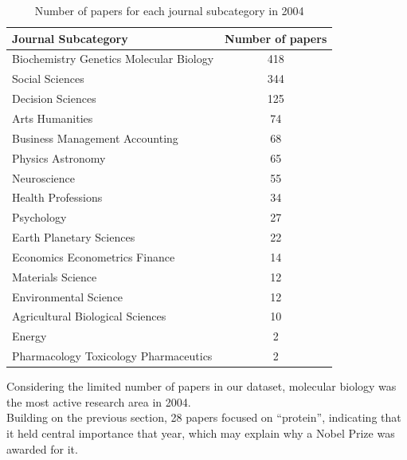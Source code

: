 \documentclass{article}
\begin{document}
\begin{table}[H]
	\centering
	\begin{tabular}{|l|c|}
		\hline
		\textbf{Journal Subcategory}            & \textbf{Number of papers} \\ \hline
		Biochemistry Genetics Molecular Biology & 418                       \\ \hline
		Social Sciences                         & 344                       \\ \hline
		Decision Sciences                       & 125                       \\ \hline
		Arts Humanities                         & 74                        \\ \hline
		Business Management Accounting          & 68                        \\ \hline
		Physics Astronomy                       & 65                        \\ \hline
		Neuroscience                            & 55                        \\ \hline
		Health Professions                      & 34                        \\ \hline
		Psychology                              & 27                        \\ \hline
		Earth Planetary Sciences                & 22                        \\ \hline
		Economics Econometrics Finance          & 14                        \\ \hline
		Materials Science                       & 12                        \\ \hline
		Environmental Science                   & 12                        \\ \hline
		Agricultural Biological Sciences        & 10                        \\ \hline
		Energy                                  & 2                         \\ \hline
		Pharmacology Toxicology Pharmaceutics   & 2                         \\ \hline
	\end{tabular}
	\caption{Number of papers for each journal subcategory in 2004}
	\label{tab:papersPerSubcategoryPerYear}
\end{table}
Considering the limited number of papers in our dataset, molecular biology
was the most active research area in 2004.\\
Building on the previous section, 28 papers
focused on ``protein'', indicating that it held central importance that year,
which may explain why a Nobel Prize was awarded for it.
\end{document}
